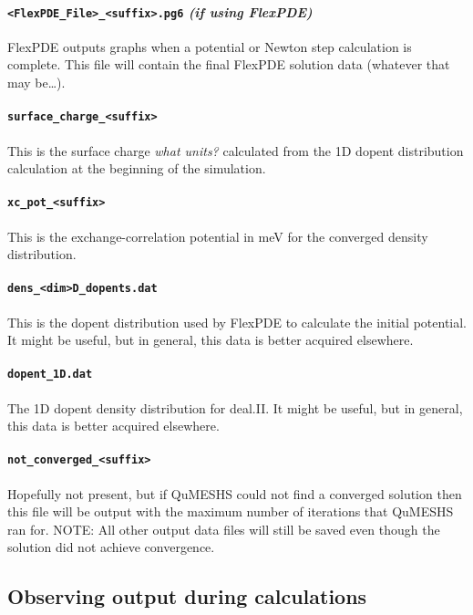 \documentclass[12pt]{article}
\newcommand{\red}[1]{{\color{red} \it #1}}
\begin{document}
\paragraph{\texttt{<FlexPDE\_File>\_<suffix>.pg6} \emph{(if using FlexPDE)}}
FlexPDE outputs graphs when a potential or Newton step calculation is complete.  This
file will contain the final FlexPDE solution data (whatever that may be\ldots).

\paragraph{\texttt{surface\_charge\_<suffix>}}
This is the surface charge \red{what units?} calculated from the 1D dopent distribution
calculation at the beginning of the simulation.

\paragraph{\texttt{xc\_pot\_<suffix>}}
This is the exchange-correlation potential in meV for the converged density distribution.

\paragraph{\texttt{dens\_<dim>D\_dopents.dat}}
This is the dopent distribution used by FlexPDE to calculate the initial potential.  It
might be useful, but in general, this data is better acquired elsewhere.

\paragraph{\texttt{dopent\_1D.dat}}
The 1D dopent density distribution for deal.II.  It might be useful, but in general, this
data is better acquired elsewhere.

\paragraph{\texttt{not\_converged\_<suffix>}}
Hopefully not present, but if QuMESHS could not find a converged solution then this
file will be output with the maximum number of iterations that QuMESHS ran for.
{\color{red} NOTE:} All other output data files will still be saved even though the
solution did not achieve convergence.


\subsection{Observing output during calculations}
\label{subsec:IntermediateOutput}
\end{document}
